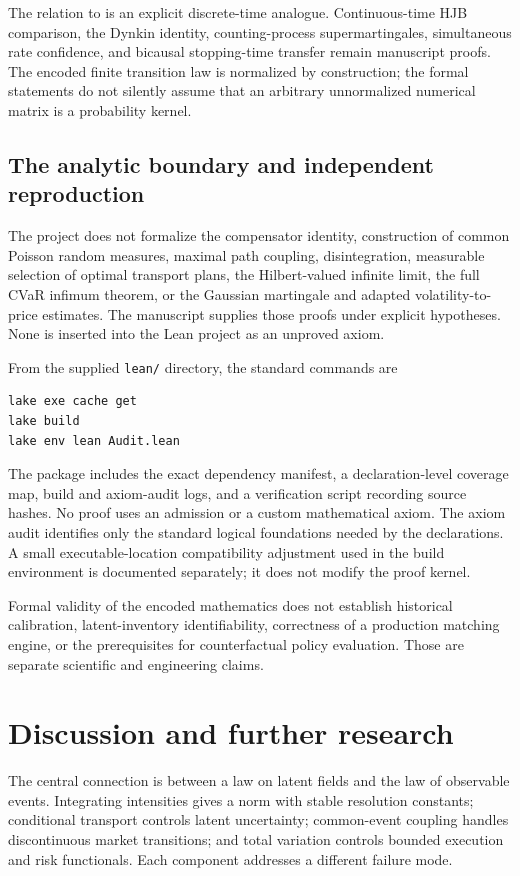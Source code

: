 The relation to  is an explicit discrete-time analogue. Continuous-time HJB comparison, the Dynkin identity, counting-process supermartingales, simultaneous rate confidence, and bicausal stopping-time transfer remain manuscript proofs. The encoded finite transition law is normalized by construction; the formal statements do not silently assume that an arbitrary unnormalized numerical matrix is a probability kernel.

\subsection{The analytic boundary and independent reproduction}
The project does not formalize the compensator identity, construction of common Poisson random measures, maximal path coupling, disintegration, measurable selection of optimal transport plans, the Hilbert-valued infinite limit, the full CVaR infimum theorem, or the Gaussian martingale and adapted volatility-to-price estimates. The manuscript supplies those proofs under explicit hypotheses. None is inserted into the Lean project as an unproved axiom.

\begin{samepage}
From the supplied \texttt{lean/} directory, the standard commands are
\begin{verbatim}
lake exe cache get
lake build
lake env lean Audit.lean
\end{verbatim}
\end{samepage}
The package includes the exact dependency manifest, a declaration-level coverage map, build and axiom-audit logs, and a verification script recording source hashes.
No proof uses an admission or a custom mathematical axiom. The axiom audit identifies only the standard logical foundations needed by the declarations. A small executable-location compatibility adjustment used in the build environment is documented separately; it does not modify the proof kernel.

Formal validity of the encoded mathematics does not establish historical calibration, latent-inventory identifiability, correctness of a production matching engine, or the prerequisites for counterfactual policy evaluation. Those are separate scientific and engineering claims.

\section{Discussion and further research}\label{sec:discussion}
The central connection is between a law on latent fields and the law of observable events. Integrating intensities gives a norm with stable resolution constants; conditional transport controls latent uncertainty; common-event coupling handles discontinuous market transitions; and total variation controls bounded execution and risk functionals. Each component addresses a different failure mode.

